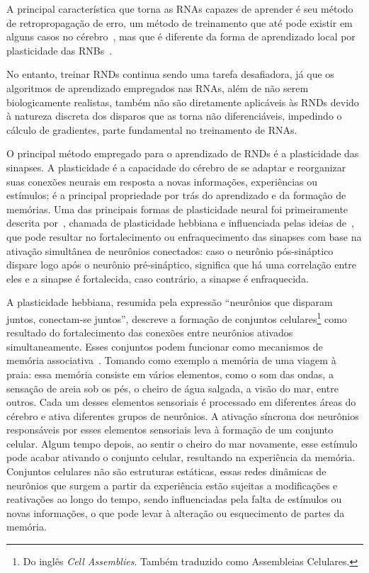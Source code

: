 A principal característica que torna as RNAs capazes de aprender é seu método de retropropagação de erro, um método de treinamento
que até pode existir em alguns casos no cérebro~\cite{lillicrapBackpropagation2020,songCan2020}, mas que é diferente da forma de
aprendizado local por plasticidade das RNBs~\cite{yamazakiSpiking2022}.

No entanto, treinar RNDs continua sendo uma tarefa desafiadora, já que os algoritmos de aprendizado empregados nas RNAs, além de
não serem biologicamente realistas, também não são diretamente aplicáveis às RNDs devido à natureza discreta dos disparos que as
torna não diferenciáveis, impedindo o cálculo de gradientes, parte fundamental no treinamento de RNAs.

O principal método empregado para o aprendizado de RNDs é a plasticidade das sinapses. A plasticidade é a capacidade do cérebro de
se adaptar e reorganizar suas conexões neurais em resposta a novas informações, experiências ou estímulos; é a principal
propriedade por trás do aprendizado e da formação de memórias. Uma das principais formas de plasticidade neural foi primeiramente
descrita por~\cite{hebbOrganization1949}, chamada de plasticidade hebbiana e influenciada pelas ideias
de~\cite{santiagoCroonian1894}, que pode resultar no fortalecimento ou enfraquecimento das sinapses com base na ativação
simultânea de neurônios conectados: caso o neurônio pós-sináptico dispare logo após o neurônio pré-sináptico, significa que há uma
correlação entre eles e a sinapse é fortalecida, caso contrário, a sinapse é enfraquecida.

A plasticidade hebbiana, resumida pela expressão ``neurônios que disparam juntos, co\-nectam-se juntos'', descreve a formação de
conjuntos celulares\footnote{Do inglês \textit{Cell Assemblies}. Também traduzido como Assembleias Celulares.} como resultado do
fortalecimento das conexões entre neurônios ativados simultaneamente. Esses conjuntos podem funcionar como mecanismos de memória
associativa~\cite{sakuraiMultiple2018}. Tomando como exemplo a memória de uma viagem à praia: essa memória consiste em vários
elementos, como o som das ondas, a sensação de areia sob os pés, o cheiro de água salgada, a visão do mar, entre outros. Cada um
desses elementos sensoriais é processado em diferentes áreas do cérebro e ativa diferentes grupos de neurônios. A ativação
síncrona dos neurônios responsáveis por esses elementos sensoriais leva à formação de um conjunto celular. Algum tempo depois, ao
sentir o cheiro do mar novamente, esse estímulo pode acabar ativando o conjunto celular, resultando na experiência da memória.
Conjuntos celulares não são estruturas estáticas, essas redes dinâmicas de neurônios que surgem a partir da experiência estão
sujeitas a modificações e reativações ao longo do tempo, sendo influenciadas pela falta de estímulos ou novas informações, o que
pode levar à alteração ou esquecimento de partes da memória.


